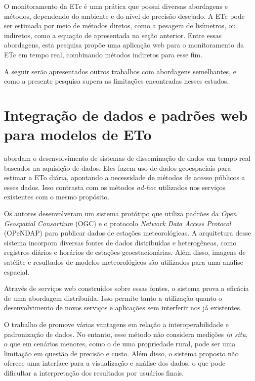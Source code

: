O monitoramento da ETc é uma prática que possui diversas abordagens e métodos, dependendo do ambiente e do nível de precisão desejado. A ETc pode ser estimada por meio de métodos diretos, como a pesagem de lisímetros, ou indiretos, como a equação de \textcite{bernardo_irrigacao2008} apresentada na seção anterior. Entre essas abordagens, esta pesquisa propõe uma aplicação web para o monitoramento da ETc em tempo real, combinando métodos indiretos para esse fim.

A seguir serão apresentados outros trabalhos com abordagens semelhantes, e como a presente pesquisa supera as limitações encontradas nesses estudos.

\section{Integração de dados e padrões web para modelos de ETo}

\textcite{Jianting_webeva2009} abordam o desenvolvimento de sistemas de disseminação de dados em tempo real baseados na aquisição de dados. Eles fazem uso de dados geoespaciais para estimar a ETo diária, apontando a necessidade de métodos de acesso públicos a esses dados. Isso contrasta com os métodos \textit{ad-hoc} utilizados nos serviços existentes com o mesmo propósito.

Os autores desenvolveram um sistema protótipo que utiliza padrões da \textit{Open Geospatial Consortium} (OGC) e o protocolo \textit{Network Data Access Protocol} (OPeNDAP) para publicar dados de estações meteorológicas. A arquitetura desse sistema incorpora diversas fontes de dados distribuídas e heterogêneas, como registros diários e horários de estações geoestacionárias. Além disso, imagens de satélite e resultados de modelos meteorológicos são utilizados para uma análise espacial. 

Através de serviços web construídos sobre essas fontes, o sistema prova a eficácia de uma abordagem distribuída. Isso permite tanto a utilização quanto o desenvolvimento de novos serviços e aplicações sem interferir nos já existentes.

O trabalho de \textcite{Jianting_webeva2009} promove várias vantagens em relação a interoperabilidade e padronização de dados. No entanto, esse método não considera medições \textit{in situ}, o que em cenários menores, como o de uma propriedade rural, pode ser uma limitação em questão de precisão e custo. Além disso, o sistema proposto não oferece uma interface para a visualização e análise dos dados, o que pode dificultar a interpretação dos resultados por usuários finais.

